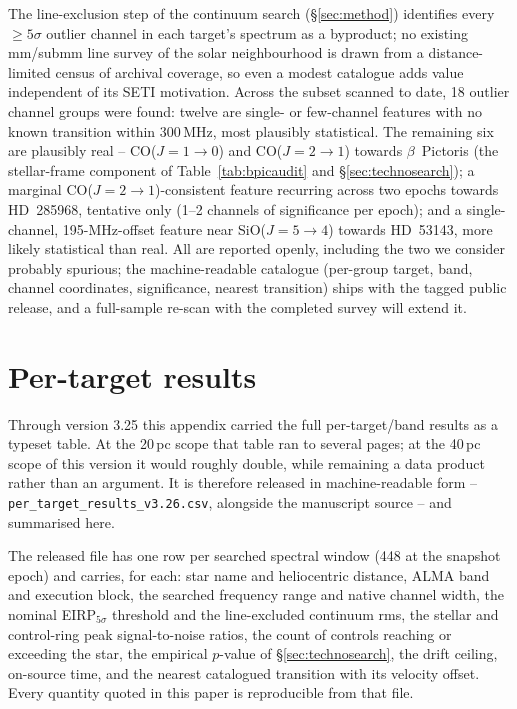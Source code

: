 \documentclass{openjournal}
\begin{document}
The line-exclusion step of the continuum search (\S\ref{sec:method})
identifies every $\geq5\sigma$ outlier channel in each target's
spectrum as a byproduct; no existing mm/submm line survey of the
solar neighbourhood is drawn from a distance-limited census of
archival coverage, so even a modest catalogue adds value independent
of its SETI motivation. Across the subset scanned to date, 18 outlier
channel groups were found: twelve are single- or few-channel features
with no known transition within 300\,MHz, most plausibly statistical.
The remaining six are plausibly real -- CO($J{=}1{\to}0$) and
CO($J{=}2{\to}1$) towards $\beta$~Pictoris (the stellar-frame
component of Table~\ref{tab:bpicaudit} and \S\ref{sec:technosearch});
a marginal CO($J{=}2{\to}1$)-consistent feature recurring across two
epochs towards HD~285968, tentative only (1--2 channels of
significance per epoch); and a single-channel, 195-MHz-offset feature
near SiO($J{=}5{\to}4$) towards HD~53143, more likely statistical than
real. All are reported openly, including the two we consider probably
spurious; the machine-readable catalogue (per-group target, band,
channel coordinates, significance, nearest transition) ships with the
tagged public release, and a full-sample re-scan with the completed
survey will extend it.

\section{Per-target results}
\label{app:table}

Through version 3.25 this appendix carried the full per-target/band
results as a typeset table. At the 20\,pc scope that table ran to
several pages; at the 40\,pc scope of this version it would roughly
double, while remaining a data product rather than an argument. It is
therefore released in machine-readable form -- \texttt{per\_target\_results\_v3.26.csv},
alongside the manuscript source -- and summarised here.

The released file has one row per searched spectral window (448 at the
snapshot epoch) and carries, for each: star name and heliocentric
distance, ALMA band and execution block, the searched frequency range
and native channel width, the nominal EIRP$_{5\sigma}$ threshold and the
line-excluded continuum rms, the stellar and control-ring peak
signal-to-noise ratios, the count of controls reaching or exceeding the
star, the empirical $p$-value of \S\ref{sec:technosearch}, the drift
ceiling, on-source time, and the nearest catalogued transition with its
velocity offset. Every quantity quoted in this paper is reproducible
from that file.
\end{document}
